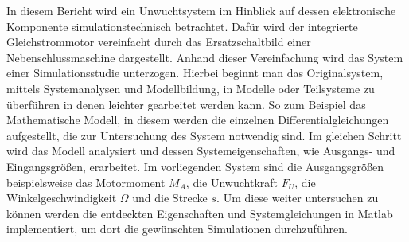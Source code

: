 
\label{Einleitung}
In diesem Bericht wird ein Unwuchtsystem im Hinblick auf dessen elektronische Komponente simulationstechnisch betrachtet. Dafür wird der integrierte Gleichstrommotor vereinfacht durch das Ersatzschaltbild einer Nebenschlussmaschine dargestellt. Anhand dieser Vereinfachung wird das System einer Simulationsstudie unterzogen. Hierbei beginnt man das Originalsystem, mittels Systemanalysen und Modellbildung, in Modelle oder Teilsysteme zu überführen in denen leichter gearbeitet werden kann. So zum Beispiel das Mathematische Modell, in diesem werden die einzelnen Differentialgleichungen aufgestellt, die zur Untersuchung des System notwendig sind. Im gleichen Schritt wird das Modell analysiert und dessen Systemeigenschaften, wie Ausgangs- und Eingangsgrößen, erarbeitet. Im vorliegenden System sind die Ausgangsgrößen beispielsweise das Motormoment $M_A$, die Unwuchtkraft $F_U$, die Winkelgeschwindigkeit $\Omega$ und die Strecke $s$. Um diese weiter untersuchen zu können werden die entdeckten Eigenschaften und Systemgleichungen in Matlab implementiert, um dort die gewünschten Simulationen durchzuführen. 
